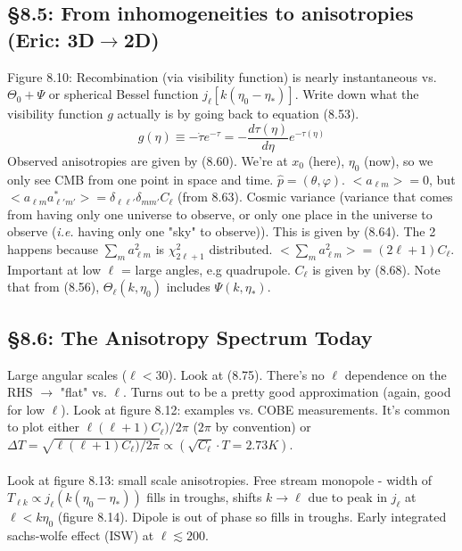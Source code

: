 \documentclass[12pt]{article}
\begin{document}
\subsection*{\S8.5: From inhomogeneities to anisotropies (Eric: 3D$\rightarrow$2D)}
Figure 8.10: Recombination (via visibility function) is nearly instantaneous vs. $\Theta_0+\Psi$ or spherical Bessel function $j_\ell[k(\eta_0-\eta_*)]$.  Write down what the visibility function $g$ actually is by going back to equation (8.53).
$$g(\eta)\equiv-\dot{\tau}e^{-\tau}=-\frac{d\tau(\eta)}{d\eta}e^{-\tau(\eta)}$$
Observed anisotropies are given by (8.60).  We're at $x_0$ (here), $\eta_0$ (now), so we only see CMB from one point in space and time.  $\hat{p}=(\theta,\varphi)$.  $<a_{\ell m}>=0$, but $<a_{\ell m}a^*_{\ell' m'}>=\delta_{\ell\ell'}\delta_{mm'}C_\ell$ (from 8.63).  Cosmic variance (variance that comes from having only one universe to observe, or only one place in the universe to observe (\emph{i.e.} having only one "sky" to observe)).  This is given by (8.64).  The 2 happens because $\displaystyle\sum_m a_{\ell m}^2$ is $\chi_{2\ell +1}^2$ distributed.  $<\displaystyle\sum_m a_{\ell m}^2>=(2\ell+1)C_\ell$.  Important at low $\ell$ = large angles, e.g quadrupole.  $C_\ell$ is given by (8.68).  Note that from (8.56), $\Theta_\ell(k,\eta_0)$ includes $\Psi(k,\eta_*)$.
\subsection*{\S8.6: The Anisotropy Spectrum Today}
Large angular scales ($\ell<30$).  Look at (8.75).  There's no $\ell$ dependence on the RHS $\rightarrow$ "flat" vs. $\ell$.  Turns out to be a pretty good approximation (again, good for low $\ell$).  Look at figure 8.12: examples vs. COBE measurements.  It's common to plot either $\ell(\ell+1)C_\ell)/2\pi$ ($2\pi$ by convention) or $\Delta T = \sqrt{\ell(\ell+1)C_\ell)/2\pi} \propto (\sqrt{C_\ell}\cdot T=2.73K)$.
\\ \\
Look at figure 8.13: small scale anisotropies.  Free stream monopole - width of $T_{\ell k} \propto j_\ell(k(\eta_0-\eta_*))$ fills in troughs, shifts $k\rightarrow\ell$ due to peak in $j_\ell$ at $\ell<k\eta_0$ (figure 8.14).  Dipole is out of phase so fills in troughs.  Early integrated sachs-wolfe effect (ISW) at $\ell\lesssim200$.
\end{document}
